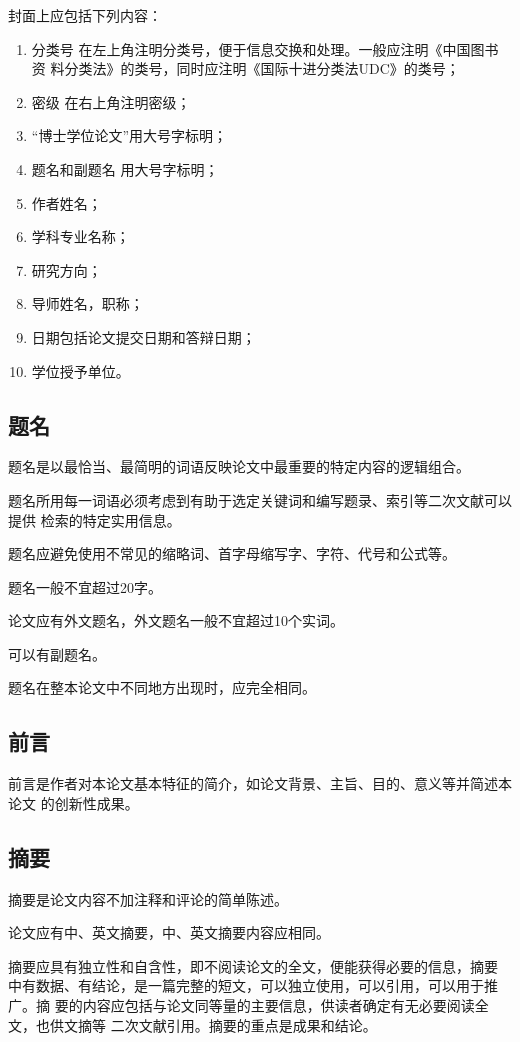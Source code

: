 \documentclass[master]{njuthesis}
\begin{document}
封面上应包括下列内容：
\begin{enumerate}
\item 分类号  在左上角注明分类号，便于信息交换和处理。一般应注明《中国图书资
  料分类法》的类号，同时应注明《国际十进分类法UDC》的类号；
\item 密级  在右上角注明密级；
\item “博士学位论文”用大号字标明；
\item 题名和副题名   用大号字标明；
\item 作者姓名；
\item 学科专业名称；
\item 研究方向；
\item 导师姓名，职称；
\item 日期包括论文提交日期和答辩日期；
\item 学位授予单位。
\end{enumerate}

\subsection{题名}

题名是以最恰当、最简明的词语反映论文中最重要的特定内容的逻辑组合。

题名所用每一词语必须考虑到有助于选定关键词和编写题录、索引等二次文献可以提供
检索的特定实用信息。

题名应避免使用不常见的缩略词、首字母缩写字、字符、代号和公式等。

题名一般不宜超过20字。

论文应有外文题名，外文题名一般不宜超过10个实词。

可以有副题名。

题名在整本论文中不同地方出现时，应完全相同。

\subsection{前言}

前言是作者对本论文基本特征的简介，如论文背景、主旨、目的、意义等并简述本论文
的创新性成果。

\subsection{摘要}

摘要是论文内容不加注释和评论的简单陈述。

论文应有中、英文摘要，中、英文摘要内容应相同。

摘要应具有独立性和自含性，即不阅读论文的全文，便能获得必要的信息，摘要
中有数据、有结论，是一篇完整的短文，可以独立使用，可以引用，可以用于推广。摘
要的内容应包括与论文同等量的主要信息，供读者确定有无必要阅读全文，也供文摘等
二次文献引用。摘要的重点是成果和结论。
\end{document}
